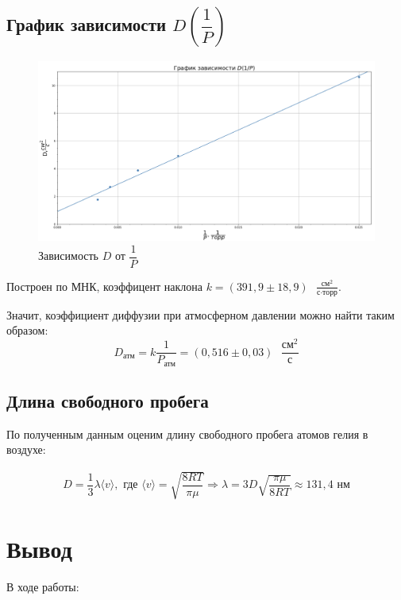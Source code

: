 \documentclass[a4paper,12pt]{article}
\theoremstyle{definition}
\begin{document}
		\subsection{График зависимости $D(\dfrac{1}{P})$}
		
		\begin{figure}[H]
			\centering
			\includegraphics[scale=0.543]{graph2}
			\caption{Зависимость $ D $ от $ \dfrac{1}{P} $}
			\label{graph2}
		\end{figure}
	
		Построен по МНК, коэффицент наклона $k = (391,9\pm18,9)\text{ } \frac{\text{см}^2}{\text{с}\cdot\text{торр}}$. 
		
		Значит, коэффициент диффузии при атмосферном давлении можно найти таким образом:\[D_\text{атм} = k\dfrac{1}{P_\text{атм}} = (0,516\pm0,03)\text{ } \frac{\text{см}^2}{\text{с}}\]
		
		\subsection{Длина свободного пробега}
		
		По полученным данным оценим длину свободного пробега атомов гелия в воздухе:
		
		\begin{align}
			D=\dfrac{1}{3}\lambda\langle v\rangle,\text{ где } \langle v \rangle = \sqrt{\dfrac{8RT}{\pi \mu}} \Rightarrow \lambda = 3D\sqrt{\dfrac{\pi \mu}{8RT}} \approx 131,4\text{ нм}
		\end{align}
		
	\section{Вывод}
	
		В ходе работы:
		
\end{document}
